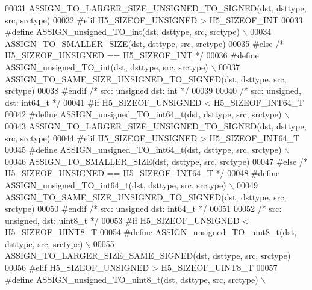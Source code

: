 \begin{DoxyCode}
00031 \textcolor{preprocessor}{        ASSIGN\_TO\_LARGER\_SIZE\_UNSIGNED\_TO\_SIGNED(dst, dsttype, src, srctype)}
00032 \textcolor{preprocessor}{#elif H5\_SIZEOF\_UNSIGNED > H5\_SIZEOF\_INT}
00033 \textcolor{preprocessor}{    #define ASSIGN\_unsigned\_TO\_int(dst, dsttype, src, srctype) \(\backslash\)}
00034 \textcolor{preprocessor}{        ASSIGN\_TO\_SMALLER\_SIZE(dst, dsttype, src, srctype)}
00035 \textcolor{preprocessor}{#else }\textcolor{comment}{/* H5\_SIZEOF\_UNSIGNED == H5\_SIZEOF\_INT */}\textcolor{preprocessor}{}
00036 \textcolor{preprocessor}{    #define ASSIGN\_unsigned\_TO\_int(dst, dsttype, src, srctype) \(\backslash\)}
00037 \textcolor{preprocessor}{        ASSIGN\_TO\_SAME\_SIZE\_UNSIGNED\_TO\_SIGNED(dst, dsttype, src, srctype)}
00038 \textcolor{preprocessor}{#endif }\textcolor{comment}{/* src: unsigned dst: int */}\textcolor{preprocessor}{}
00039 
00040 \textcolor{comment}{/* src: unsigned, dst: int64\_t */}
00041 \textcolor{preprocessor}{#if H5\_SIZEOF\_UNSIGNED < H5\_SIZEOF\_INT64\_T}
00042 \textcolor{preprocessor}{    #define ASSIGN\_unsigned\_TO\_int64\_t(dst, dsttype, src, srctype) \(\backslash\)}
00043 \textcolor{preprocessor}{        ASSIGN\_TO\_LARGER\_SIZE\_UNSIGNED\_TO\_SIGNED(dst, dsttype, src, srctype)}
00044 \textcolor{preprocessor}{#elif H5\_SIZEOF\_UNSIGNED > H5\_SIZEOF\_INT64\_T}
00045 \textcolor{preprocessor}{    #define ASSIGN\_unsigned\_TO\_int64\_t(dst, dsttype, src, srctype) \(\backslash\)}
00046 \textcolor{preprocessor}{        ASSIGN\_TO\_SMALLER\_SIZE(dst, dsttype, src, srctype)}
00047 \textcolor{preprocessor}{#else }\textcolor{comment}{/* H5\_SIZEOF\_UNSIGNED == H5\_SIZEOF\_INT64\_T */}\textcolor{preprocessor}{}
00048 \textcolor{preprocessor}{    #define ASSIGN\_unsigned\_TO\_int64\_t(dst, dsttype, src, srctype) \(\backslash\)}
00049 \textcolor{preprocessor}{        ASSIGN\_TO\_SAME\_SIZE\_UNSIGNED\_TO\_SIGNED(dst, dsttype, src, srctype)}
00050 \textcolor{preprocessor}{#endif }\textcolor{comment}{/* src: unsigned dst: int64\_t */}\textcolor{preprocessor}{}
00051 
00052 \textcolor{comment}{/* src: unsigned, dst: uint8\_t */}
00053 \textcolor{preprocessor}{#if H5\_SIZEOF\_UNSIGNED < H5\_SIZEOF\_UINT8\_T}
00054 \textcolor{preprocessor}{    #define ASSIGN\_unsigned\_TO\_uint8\_t(dst, dsttype, src, srctype) \(\backslash\)}
00055 \textcolor{preprocessor}{        ASSIGN\_TO\_LARGER\_SIZE\_SAME\_SIGNED(dst, dsttype, src, srctype)}
00056 \textcolor{preprocessor}{#elif H5\_SIZEOF\_UNSIGNED > H5\_SIZEOF\_UINT8\_T}
00057 \textcolor{preprocessor}{    #define ASSIGN\_unsigned\_TO\_uint8\_t(dst, dsttype, src, srctype) \(\backslash\)}

\end{DoxyCode}

